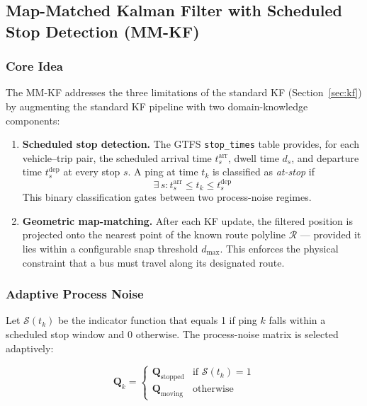 \documentclass[12pt, a4paper]{article}
\begin{document}
\subsection{Map-Matched Kalman Filter with Scheduled Stop Detection (MM-KF)}
\label{sec:mmkf}

\subsubsection{Core Idea}

The MM-KF addresses the three limitations of the standard KF
(Section~\ref{sec:kf}) by augmenting the standard KF pipeline with two
domain-knowledge components:

\begin{enumerate}
    \item \textbf{Scheduled stop detection.} The GTFS \texttt{stop\_times}
          table provides, for each vehicle–trip pair, the scheduled arrival
          time $t^{\text{arr}}_s$, dwell time $d_s$, and departure time
          $t^{\text{dep}}_s$ at every stop $s$. A ping at time $t_k$ is
          classified as \emph{at-stop} if
          \[
              \exists\, s : t^{\text{arr}}_s \leq t_k \leq t^{\text{dep}}_s
          \]
          This binary classification gates between two process-noise regimes.

    \item \textbf{Geometric map-matching.} After each KF update, the filtered
          position is projected onto the nearest point of the known route
          polyline $\mathcal{R}$ — provided it lies within a configurable snap
          threshold $d_{\max}$. This enforces the physical constraint that a
          bus must travel along its designated route.
\end{enumerate}

\subsubsection{Adaptive Process Noise}

Let $\mathcal{S}(t_k)$ be the indicator function that equals 1 if ping $k$
falls within a scheduled stop window and 0 otherwise. The process-noise matrix
is selected adaptively:

\begin{equation}
    \mathbf{Q}_k =
    \begin{cases}
        \mathbf{Q}_{\text{stopped}} & \text{if } \mathcal{S}(t_k) = 1 \\
        \mathbf{Q}_{\text{moving}}  & \text{otherwise}
    \end{cases}
    \label{eq:adaptive_Q}
\end{equation}
\end{document}
